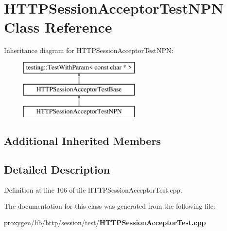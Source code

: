 \section{H\+T\+T\+P\+Session\+Acceptor\+Test\+N\+PN Class Reference}
\label{classHTTPSessionAcceptorTestNPN}
Inheritance diagram for H\+T\+T\+P\+Session\+Acceptor\+Test\+N\+PN\+:\begin{figure}[H]
\begin{center}
\leavevmode
\includegraphics[height=3.000000cm]{classHTTPSessionAcceptorTestNPN}
\end{center}
\end{figure}
\subsection*{Additional Inherited Members}


\subsection{Detailed Description}


Definition at line 106 of file H\+T\+T\+P\+Session\+Acceptor\+Test.\+cpp.



The documentation for this class was generated from the following file\+:\begin{DoxyCompactItemize}
\item 
proxygen/lib/http/session/test/{\bf H\+T\+T\+P\+Session\+Acceptor\+Test.\+cpp}\end{DoxyCompactItemize}
